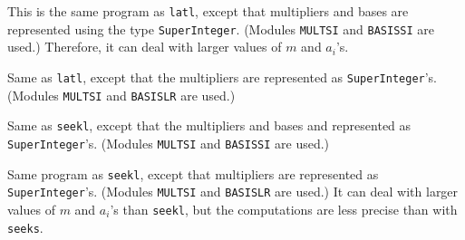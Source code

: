 
This is the same program as {\tt latl}, except that multipliers and
bases are represented using the type {\tt SuperInteger}.
(Modules {\tt MULTSI} and {\tt BASISSI} are used.)
Therefore, it can deal with larger values of $m$ and $a_i$'s.

\bigskip\bigskip

Same as {\tt latl}, except that the multipliers
are represented as {\tt SuperInteger}'s.
(Modules {\tt MULTSI} and {\tt BASISLR} are used.)

\bigskip\bigskip

Same as {\tt seekl}, except that the multipliers and
bases and represented as {\tt SuperInteger}'s.
(Modules {\tt MULTSI} and {\tt BASISSI} are used.)

\bigskip\bigskip

Same program as {\tt seekl}, except that multipliers
are represented as {\tt SuperInteger}'s.
(Modules {\tt MULTSI} and {\tt BASISLR} are used.)
It can deal with larger values of $m$ and $a_i$'s than {\tt seekl},
but the computations are less precise than with {\tt seeks}.

\bigskip\bigskip


